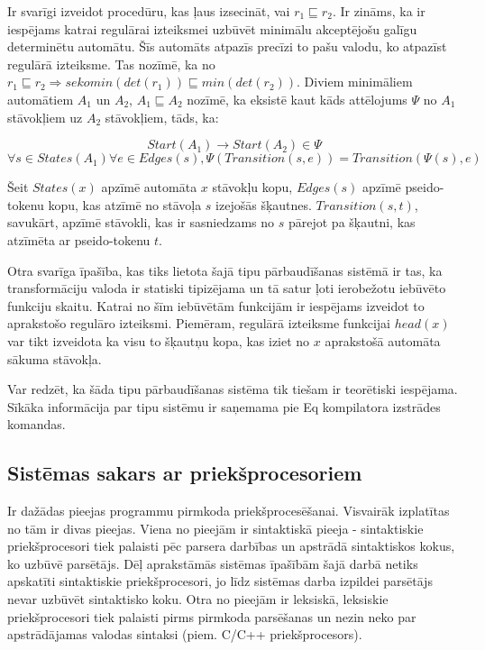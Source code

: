 Ir svarīgi izveidot procedūru, kas ļaus izsecināt, vai $r_1 {\sqsubseteq} r_2$. Ir zināms, ka ir iespējams katrai regulārai izteiksmei uzbūvēt minimālu akceptējošu galīgu determinētu automātu. Šīs automāts atpazīs precīzi to pašu valodu, ko atpazīst regulārā izteiksme. Tas nozīmē, ka no $r_1 \sqsubseteq r_2 \Rightarrow seko min (det (r_1)) \sqsubseteq min (det (r_2))$. Diviem minimāliem automātiem $A_1$ un $A_2$, $A_1 \sqsubseteq A_2$ nozīmē, ka eksistē kaut kāds attēlojums $\Psi$ no $A_1$ stāvokļiem uz $A_2$ stāvokļiem, tāds, ka:

\[
    Start (A_1) \to Start (A_2) \in \Psi
\]
\[
    \forall s \in States (A_1) \forall e \in Edges (s),
    \Psi (Transition (s, e)) = Transition (\Psi (s), e)
\]

Šeit $States (x)$ apzīmē automāta $x$ stāvokļu kopu, $Edges (s)$ apzīmē pseido-tokenu kopu, kas atzīmē no stāvoļa $s$ izejošās šķautnes. $Transition(s, t)$, savukārt, apzīmē stāvokli, kas ir sasniedzams no $s$ pārejot pa šķautni, kas atzīmēta ar pseido-tokenu $t$.

Otra svarīga īpašība, kas tiks lietota šajā tipu pārbaudīšanas sistēmā ir tas, ka transformāciju valoda ir statiski tipizējama un tā satur ļoti ierobežotu iebūvēto funkciju skaitu. Katrai no šīm iebūvētām funkcijām ir iespējams izveidot to aprakstošo regulāro izteiksmi. Piemēram, regulārā izteiksme funkcijai $head (x)$ var tikt izveidota ka visu to šķautņu kopa, kas iziet no $x$ aprakstošā automāta sākuma stāvokļa.

Var redzēt, ka šāda tipu pārbaudīšanas sistēma tik tiešam ir teorētiski iespējama. Sīkāka informācija par tipu sistēmu ir saņemama pie Eq kompilatora izstrādes komandas.

\subsection{Sistēmas sakars ar priekšprocesoriem}
Ir dažādas pieejas programmu pirmkoda priekšprocesēšanai. Visvairāk izplatītas no tām ir divas pieejas. Viena no pieejām ir sintaktiskā pieeja - sintaktiskie priekšprocesori tiek palaisti pēc parsera darbības un apstrādā sintaktiskos kokus, ko uzbūvē parsētājs. Dēļ aprakstāmās sistēmas īpašībām šajā darbā netiks apskatīti sintaktiskie priekšprocesori, jo līdz sistēmas darba izpildei parsētājs nevar uzbūvēt sintaktisko koku. Otra no pieejām ir leksiskā, leksiskie priekšprocesori tiek palaisti pirms pirmkoda parsēšanas un nezin neko par apstrādājamas valodas sintaksi (piem. C/C++ priekšprocesors). 


